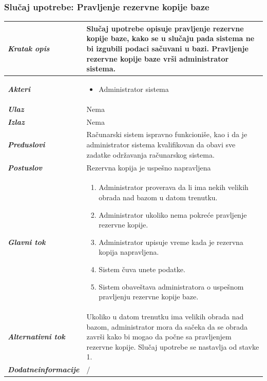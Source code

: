 \documentclass[20pt]{article}
\begin{document}
\subsubsection{\bfseries Slu\v{c}aj upotrebe: Pravljenje rezervne kopije baze}
\begin{center}
\begin{longtable}{p{0.23\linewidth} p{0.77\linewidth}}
\hline
 {\it \bfseries Kratak opis} & Slu\v {c}aj upotrebe opisuje pravljenje rezervne kopije baze, kako se u slu\v {c}aju pada sistema ne bi izgubili podaci sa\v {c}uvani u bazi. Pravljenje rezervne kopije baze vr\v {s}i administrator sistema.\\ 
 \hline
 {\it \bfseries Akteri} & \begin{itemize}
    \item Administrator sistema
\end{itemize}\\
\hline
 {\it \bfseries Ulaz} & Nema\\
 \hline
 {\it \bfseries Izlaz} & Nema\\
 \hline
 
 {\it \bfseries Preduslovi} & Ra\v {c}unarski sistem ispravno funkcioni\v {s}e, kao i da je administrator sistema kvalifikovan da obavi sve zadatke odr\v {z}avanja ra\v {c}unarskog sistema.\\
 \hline
 
 {\it \bfseries Postuslov} & Rezervna kopija je uspe\v {s}no napravljena\\
 \hline

     {\it \bfseries Glavni tok} &  
     \begin{enumerate}
         \item Administrator proverava da li ima nekih velikih obrada nad bazom u datom trenutku.
         \item Administrator ukoliko nema pokre\' ce pravljenje rezervne kopije.
         \item Administrator upisuje vreme kada je rezervna kopija napravljena.
         \item Sistem \v {c}uva unete podatke.
         \item Sistem obave\v {s}tava administratora o uspe\v {s}nom pravljenju rezervne kopije baze.
    \end{enumerate}\\
 \hline
 {\it \bfseries Alternativni tok} & Ukoliko u datom trenutku ima velikih obrada nad bazom, administrator mora da sa\v {c}eka da se obrada zavr\v {s}i kako bi mogao da po\v {c}ne sa pravljenjem rezervne kopije. Slu\v {c}aj upotrebe se nastavlja od stavke 1.\\
 \hline
 {\it \bfseries Dodatne\newline informacije} & /\\
 \hline
\end{longtable}
\end{center}
\newpage
\end{document}

